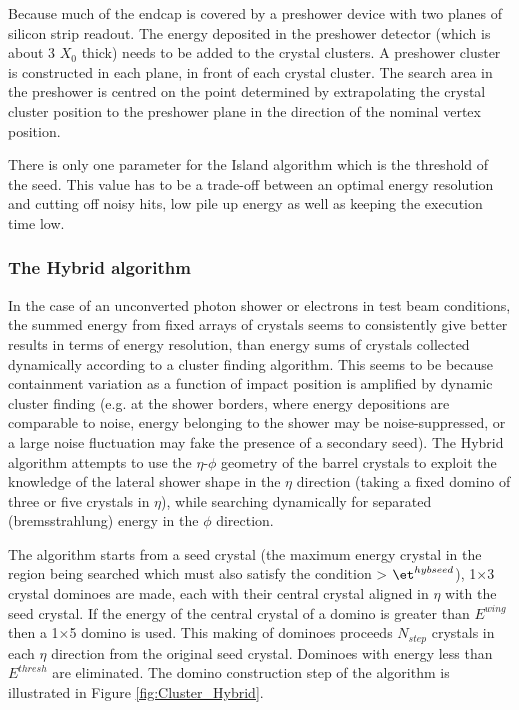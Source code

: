Because much of the endcap is covered by a preshower device with two planes of silicon strip readout. The energy deposited in the preshower detector (which is about 3 $X_{0}$ thick) needs to be added to the crystal clusters. A preshower cluster is constructed in each plane, in front of each crystal cluster. The search area in the preshower is centred on the point determined by extrapolating the crystal cluster position to the preshower plane in the direction of the nominal vertex position.

There is only one parameter for the Island algorithm which is the \et threshold of the seed. This value has to be a trade-off between an optimal energy resolution and cutting off noisy hits, low pile up energy as well as keeping the execution time low.

\subsubsection*{The Hybrid algorithm}\label{subsec:Hybrid}

In the case of an unconverted photon shower or electrons in test beam conditions, the summed energy from fixed arrays of crystals seems to consistently give better results in terms of energy resolution, than energy sums of crystals collected dynamically according to a cluster finding algorithm. This seems to be because containment variation as a function of impact position is amplified by dynamic cluster finding (e.g. at the shower borders, where energy depositions are
comparable to noise, energy belonging to the shower may be noise-suppressed, or a large noise fluctuation may fake the presence of a secondary seed). The Hybrid algorithm attempts to use the $\eta$-$\phi$ geometry of the barrel crystals to exploit the knowledge of the lateral shower shape in the $\eta$ direction (taking a fixed domino of three or five crystals in $\eta$), while searching dynamically for separated (bremsstrahlung) energy in the $\phi$ direction.

The algorithm starts from a seed crystal (the maximum energy crystal in the region being searched which must also satisfy the condition \et> $\et^{hybseed}$), 1$\times$3 crystal dominoes are made, each with their central crystal aligned in $\eta$ with the seed crystal. If the energy of the central crystal of a domino
is greater than $E^{wing}$ then a 1$\times$5 domino is used. This making of dominoes proceeds $N_{step}$ crystals in each $\eta$ direction from the original seed crystal. Dominoes with energy less than $E^{thresh}$ are eliminated. The domino construction step of the algorithm is illustrated in Figure \ref{fig:Cluster_Hybrid}.

